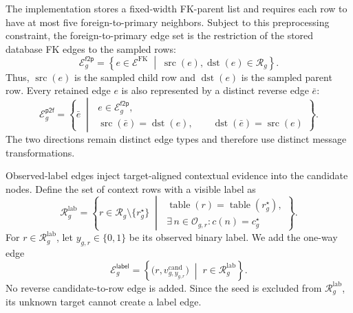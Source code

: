 \documentclass[11pt]{article}
\DeclareMathOperator{\src}{src}
\DeclareMathOperator{\dst}{dst}
\DeclareMathOperator{\table}{table}
\begin{document}
The implementation stores a fixed-width FK-parent list and requires each
row to have at most five foreign-to-primary neighbors.  Subject to this
preprocessing constraint, the foreign-to-primary edge set is the restriction
of the stored database FK edges to the sampled rows:
\begin{equation}
    \mathcal E_g^{\mathsf{f2p}}
    =
    \left\{
        e\in\mathcal E^{\mathrm{FK}}
        \;\middle|\;
        \src(e),\dst(e)\in\mathcal R_g
    \right\}.
    \label{eq:f2p-edges}
\end{equation}
Thus, \(\src(e)\) is the sampled child row and \(\dst(e)\) is the sampled
parent row.  Every retained edge \(e\) is also represented by a distinct
reverse edge \(\bar e\):
\begin{equation}
    \mathcal E_g^{\mathsf{p2f}}
    =
    \left\{
        \bar e
        \;\middle|\;
        \begin{array}{l}
        e\in\mathcal E_g^{\mathsf{f2p}},\\[-1mm]
        \src(\bar e)=\dst(e),\qquad
        \dst(\bar e)=\src(e)
        \end{array}
    \right\}.
    \label{eq:p2f-edges}
\end{equation}
The two directions remain distinct edge types and therefore use distinct
message transformations.

Observed-label edges inject target-aligned contextual evidence into the
candidate nodes.  Define the set of context rows with a visible label as
\begin{equation}
    \mathcal R_g^{\mathrm{lab}}
    =
    \left\{
        r\in\mathcal R_g\setminus\{r_g^\star\}
        \;\middle|\;
        \begin{array}{l}
        \table(r)=\table(r_g^\star),\\[-1mm]
        \exists\,n\in\mathcal O_{g,r}:c(n)=c_g^\star
        \end{array}
    \right\}.
    \label{eq:observed-label-rows}
\end{equation}
For \(r\in\mathcal R_g^{\mathrm{lab}}\), let
\(y_{g,r}\in\{0,1\}\) be its observed
binary label.  We add the one-way edge
\begin{equation}
    \mathcal E_g^{\mathsf{label}}
    =
    \left\{
        \bigl(r,v_{g,y_{g,r}}^{\mathrm{cand}}\bigr)
        \;\middle|\;
        r\in\mathcal R_g^{\mathrm{lab}}
    \right\}.
    \label{eq:label-edges}
\end{equation}
No reverse candidate-to-row edge is added.  Since the seed is excluded from
\(\mathcal R_g^{\mathrm{lab}}\), its unknown target cannot create a label
edge.
\end{document}
